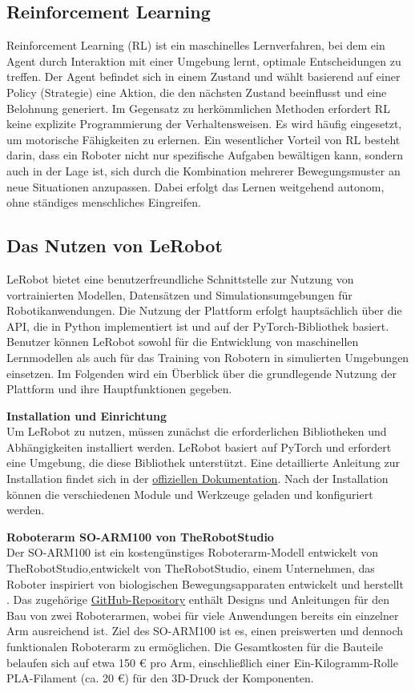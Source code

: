 \documentclass[a4paper, 12pt]{article}
\begin{document}
\subsection{Reinforcement Learning} \label{reinforcement_learning}
Reinforcement Learning (RL) ist ein maschinelles Lernverfahren, bei dem ein Agent durch Interaktion mit einer Umgebung lernt, optimale Entscheidungen zu treffen. Der Agent befindet sich in einem Zustand und wählt basierend auf einer Policy (Strategie) eine Aktion, die den nächsten Zustand beeinflusst und eine Belohnung generiert. Im Gegensatz zu herkömmlichen Methoden erfordert RL keine explizite Programmierung der Verhaltensweisen. Es wird häufig eingesetzt, um motorische Fähigkeiten zu erlernen. Ein wesentlicher Vorteil von RL besteht darin, dass ein Roboter nicht nur spezifische Aufgaben bewältigen kann, sondern auch in der Lage ist, sich durch die Kombination mehrerer Bewegungsmuster an neue Situationen anzupassen. Dabei erfolgt das Lernen weitgehend autonom, ohne ständiges menschliches Eingreifen. \cite{learning_motor_skills}

\subsection{Das Nutzen von LeRobot} \label{using_lerobot}
LeRobot bietet eine benutzerfreundliche Schnittstelle zur Nutzung von vortrainierten Modellen, Datensätzen und Simulationsumgebungen für Robotikanwendungen. Die Nutzung der Plattform erfolgt hauptsächlich über die API, die in Python implementiert ist und auf der PyTorch-Bibliothek basiert. Benutzer können LeRobot sowohl für die Entwicklung von maschinellen Lernmodellen als auch für das Training von Robotern in simulierten Umgebungen einsetzen. Im Folgenden wird ein Überblick über die grundlegende Nutzung der Plattform und ihre Hauptfunktionen gegeben.

\textbf{Installation und Einrichtung}\\
Um LeRobot zu nutzen, müssen zunächst die erforderlichen Bibliotheken und Abhängigkeiten installiert werden. LeRobot basiert auf PyTorch und erfordert eine Umgebung, die diese Bibliothek unterstützt. Eine detaillierte Anleitung zur Installation findet sich in der \href{https://github.com/huggingface/lerobot}{offiziellen Dokumentation}. Nach der Installation können die verschiedenen Module und Werkzeuge geladen und konfiguriert werden.

\textbf{Roboterarm SO-ARM100 von TheRobotStudio}\\
Der SO-ARM100 ist ein kostengünstiges Roboterarm-Modell entwickelt von TheRobotStudio,entwickelt von TheRobotStudio, einem Unternehmen, das Roboter inspiriert von biologischen Bewegungsapparaten entwickelt und herstellt \cite{the_robot_studio}. Das zugehörige \href{https://github.com/TheRobotStudio/SO-ARM100}{GitHub-Repository} enthält Designs und Anleitungen für den Bau von zwei Roboterarmen, wobei für viele Anwendungen bereits ein einzelner Arm ausreichend ist. Ziel des SO-ARM100 ist es, einen preiswerten und dennoch funktionalen Roboterarm zu ermöglichen. Die Gesamtkosten für die Bauteile belaufen sich auf etwa 150 € pro Arm, einschließlich einer Ein-Kilogramm-Rolle PLA-Filament (ca. 20 €) für den 3D-Druck der Komponenten. \cite{so_arm100}
\end{document}
